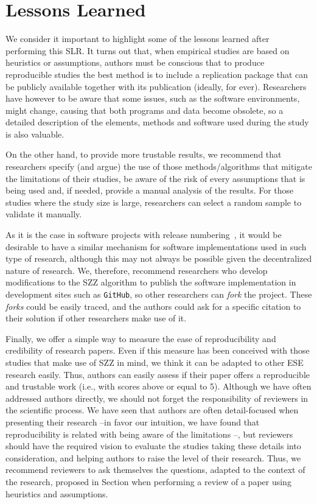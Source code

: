 \documentclass[a4paper, 12pt]{book}
\begin{document}
\section{Lessons Learned}
\label{sec:lessons}

We consider it important to highlight some of the lessons learned after performing this SLR. It turns out that, when empirical studies are based on heuristics or assumptions, authors must be conscious that to produce reproducible studies the best method is to include a replication package that can be publicly available together with its publication (ideally, for ever). Researchers have however to be aware that some issues, such as the software environments, might change, causing that both programs and data become obsolete, so a detailed description of the elements, methods and software used during the study is also valuable.

On the other hand, to provide more trustable results, we recommend that researchers specify (and argue) the use of those methods/algorithms that mitigate the limitations of their studies, be aware of the risk of every assumptions that is being used and, if needed, provide a manual analysis of the results. For those studies where the study size is large, researchers can select a random sample to validate it manually.

As it is the case in software projects with release numbering~\cite{israeli2010linux}, it would be desirable to have a similar mechanism for software implementations used in such type of research, although this may not always be possible given the decentralized nature of research. We, therefore, recommend researchers who develop modifications to the SZZ algorithm to publish the software implementation in development sites such as \texttt{GitHub}, so other researchers can \emph{fork} the project. These \emph{forks} could be easily traced, and the authors could ask for a specific citation to their solution if other researchers make use of it.

Finally, we offer a simple way to measure the ease of reproducibility and credibility of research papers. Even if this measure has been conceived with those studies that make use of SZZ in mind, we think it can be adapted to other ESE research easily. Thus, authors can easily assess if their paper offers a reproducible and trustable work (i.e., with scores above or equal to 5). Although we have often addressed authors directly, we should not forget the responsibility of reviewers in the scientific process. We have seen that authors are often detail-focused when presenting their research --in favor our intuition, we have found that reproducibility is related with being aware of the limitations --, but reviewers should have the required vision to evaluate the studies taking these details into consideration, and helping authors to raise the level of their research. Thus, we recommend reviewers to ask themselves the questions, adapted to the context of the research, proposed in Section when performing a review of a paper using heuristics and assumptions.
\end{document}
